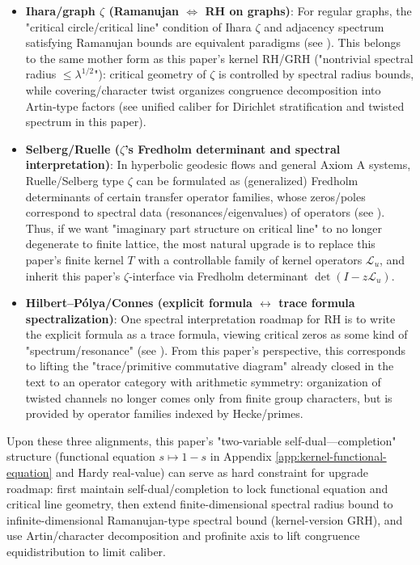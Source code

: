 \begin{itemize}
  \item \textbf{Ihara/graph \(\zeta\) (Ramanujan \(\Leftrightarrow\) RH on graphs)}:
  For regular graphs, the "critical circle/critical line" condition of Ihara \(\zeta\) and adjacency spectrum satisfying Ramanujan bounds are equivalent paradigms (see \cite{TerrasZetaGraphs,StarkTerras1996GraphCoverings}). This belongs to the same mother form as this paper's kernel RH/GRH ("nontrivial spectral radius \(\le \lambda^{1/2}\)"): critical geometry of \(\zeta\) is controlled by spectral radius bounds, while covering/character twist organizes congruence decomposition into Artin-type factors (see unified caliber for Dirichlet stratification and twisted spectrum in this paper).
  \item \textbf{Selberg/Ruelle (\(\zeta\)'s Fredholm determinant and spectral interpretation)}:
  In hyperbolic geodesic flows and general Axiom A systems, Ruelle/Selberg type \(\zeta\) can be formulated as (generalized) Fredholm determinants of certain transfer operator families, whose zeros/poles correspond to spectral data (resonances/eigenvalues) of operators (see \cite{Ruelle1976ZetaExpanding,ParryPollicott1990Zeta,Fried1986RuelleSelberg}). Thus, if we want "imaginary part structure on critical line" to no longer degenerate to finite lattice, the most natural upgrade is to replace this paper's finite kernel \(T\) with a controllable family of kernel operators \(\mathcal{L}_u\), and inherit this paper's \(\zeta\)-interface via Fredholm determinant \(\det(I-z\mathcal{L}_u)\).
  \item \textbf{Hilbert--Pólya/Connes (explicit formula \(\leftrightarrow\) trace formula spectralization)}:
  One spectral interpretation roadmap for RH is to write the explicit formula as a trace formula, viewing critical zeros as some kind of "spectrum/resonance" (see \cite{Connes1999TraceFormulaNCG}). From this paper's perspective, this corresponds to lifting the "trace/primitive commutative diagram" already closed in the text to an operator category with arithmetic symmetry: organization of twisted channels no longer comes only from finite group characters, but is provided by operator families indexed by Hecke/primes.
\end{itemize}
Upon these three alignments, this paper's "two-variable self-dual—completion" structure (functional equation \(s\mapsto 1-s\) in Appendix \ref{app:kernel-functional-equation} and Hardy real-value) can serve as hard constraint for upgrade roadmap: first maintain self-dual/completion to lock functional equation and critical line geometry, then extend finite-dimensional spectral radius bound to infinite-dimensional Ramanujan-type spectral bound (kernel-version GRH), and use Artin/character decomposition and profinite axis to lift congruence equidistribution to limit caliber.

